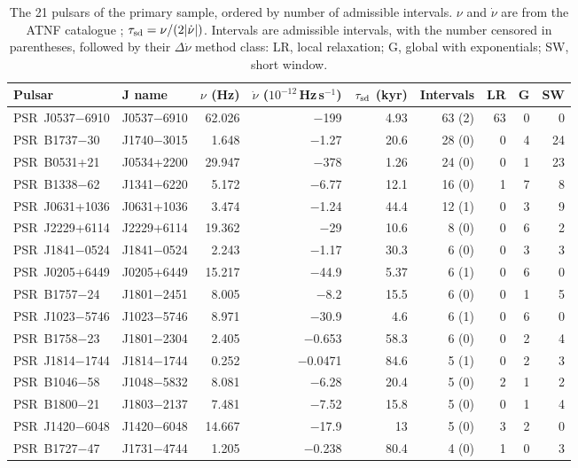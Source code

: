 \documentclass[fleqn,usenatbib]{mnras}
\begin{document}
\begin{table}
\centering
\caption{The 21 pulsars of the primary sample, ordered by number of
admissible intervals. $\nu$ and $\dot\nu$ are from the ATNF catalogue
\citep{manchester2005}; $\tau_{\rm sd}=\nu/(2|\dot\nu|)$. Intervals are
admissible intervals, with the number censored in parentheses, followed by
their $\Delta\dot\nu$ method class: LR, local relaxation; G, global with
exponentials; SW, short window.}
\label{tab:sample}
\begin{tabular}{llrrrrrrr}
\toprule
Pulsar & J name & $\nu$ (Hz) & $\dot\nu$ ($10^{-12}$\,Hz\,s$^{-1}$) &
$\tau_{\rm sd}$ (kyr) & Intervals & LR & G & SW\\
\midrule
PSR~J0537$-$6910 & J0537$-$6910 & 62.026 & $-$199 & 4.93 & 63 (2) & 63 & 0 & 0 \\
PSR~B1737$-$30 & J1740$-$3015 & 1.648 & $-$1.27 & 20.6 & 28 (0) & 0 & 4 & 24 \\
PSR~B0531+21 & J0534+2200 & 29.947 & $-$378 & 1.26 & 24 (0) & 0 & 1 & 23 \\
PSR~B1338$-$62 & J1341$-$6220 & 5.172 & $-$6.77 & 12.1 & 16 (0) & 1 & 7 & 8 \\
PSR~J0631+1036 & J0631+1036 & 3.474 & $-$1.24 & 44.4 & 12 (1) & 0 & 3 & 9 \\
PSR~J2229+6114 & J2229+6114 & 19.362 & $-$29 & 10.6 & 8 (0) & 0 & 6 & 2 \\
PSR~J1841$-$0524 & J1841$-$0524 & 2.243 & $-$1.17 & 30.3 & 6 (0) & 0 & 3 & 3 \\
PSR~J0205+6449 & J0205+6449 & 15.217 & $-$44.9 & 5.37 & 6 (1) & 0 & 6 & 0 \\
PSR~B1757$-$24 & J1801$-$2451 & 8.005 & $-$8.2 & 15.5 & 6 (0) & 0 & 1 & 5 \\
PSR~J1023$-$5746 & J1023$-$5746 & 8.971 & $-$30.9 & 4.6 & 6 (1) & 0 & 6 & 0 \\
PSR~B1758$-$23 & J1801$-$2304 & 2.405 & $-$0.653 & 58.3 & 6 (0) & 0 & 2 & 4 \\
PSR~J1814$-$1744 & J1814$-$1744 & 0.252 & $-$0.0471 & 84.6 & 5 (1) & 0 & 2 & 3 \\
PSR~B1046$-$58 & J1048$-$5832 & 8.081 & $-$6.28 & 20.4 & 5 (0) & 2 & 1 & 2 \\
PSR~B1800$-$21 & J1803$-$2137 & 7.481 & $-$7.52 & 15.8 & 5 (0) & 0 & 1 & 4 \\
PSR~J1420$-$6048 & J1420$-$6048 & 14.667 & $-$17.9 & 13 & 5 (0) & 3 & 2 & 0 \\
PSR~B1727$-$47 & J1731$-$4744 & 1.205 & $-$0.238 & 80.4 & 4 (0) & 1 & 0 & 3 \\

\end{tabular}
\end{table}
\end{document}
